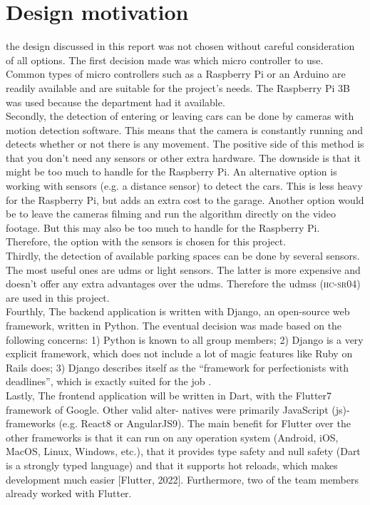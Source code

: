 \clearpage

\section{Design motivation}\label{sec:design-motivation}
the design discussed in this report was not chosen without careful consideration of all options. The first decision made was which micro controller to use. Common types of micro controllers such as a Raspberry Pi or an Arduino are readily available and are suitable for the project's needs. The Raspberry Pi 3B was used because the department had it available. \\

Secondly, the detection of entering or leaving cars can be done by cameras with motion detection software. This means that the camera is constantly running and detects whether or not there is any movement. The positive side of this method is that you don't need any sensors or other extra hardware. The downside is that it might be too much to handle for the Raspberry Pi. An alternative option is working with sensors (e.g. a distance sensor) to detect the cars. This is less heavy for the Raspberry Pi, but adds an extra cost to the garage. Another option would be to leave the cameras filming and run the algorithm directly on the video footage. But this may also be too much to handle for the Raspberry Pi. Therefore, the option with the sensors is chosen for this project. \\

Thirdly, the detection of available parking spaces can be done by several sensors. The most useful ones are \ac{udms} or light sensors. The latter is more expensive and doesn't offer any extra advantages over the \ac{udms}. Therefore the \ac{udms}s (\textsc{hc-sr04}) are used in this project.\\

Fourthly, The backend application is written with Django, an open-source web framework, written in Python. The eventual decision was made based on the following concerns: 1) Python is known to all group members; 2) Django is a very explicit framework, which does not include a lot of magic features like Ruby on Rails does; 3) Django describes itself as the ``framework for perfectionists with deadlines'', which is exactly suited for the job \cite{django_website}. \\

Lastly, The frontend application will be written in Dart, with the Flutter7 framework of Google. Other valid alter-
natives were primarily JavaScript (js)-frameworks (e.g. React8 or AngularJS9). The main benefit for Flutter
over the other frameworks is that it can run on any operation system (Android, iOS, MacOS, Linux, Windows,
etc.), that it provides type safety and null safety (Dart is a strongly typed language) and that it supports
hot reloads, which makes development much easier [Flutter, 2022]. Furthermore, two of the team members
already worked with Flutter. \\

